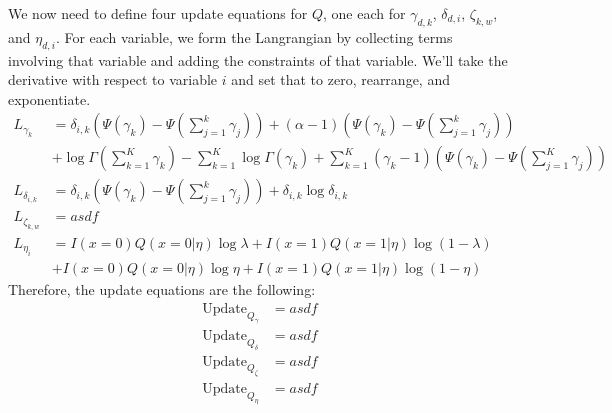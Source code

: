 \documentclass[12pt]{article}
\begin{document}
We now need to define four update equations for $Q$, one each for $\gamma_{d,k}$, $\delta_{d,i}$, $\zeta_{k,w}$, and $\eta_{d,i}$.  For each variable, we form the Langrangian by collecting terms involving that variable and adding the constraints of that variable.  We'll take the derivative with respect to variable $i$ and set that to zero, rearrange, and exponentiate.
\begin{align*}
L_{\gamma_{k}} &= \delta_{i,k}(\Psi(\gamma_k) - \Psi(\sum_{j=1}^k \gamma_j) ) + (\alpha - 1)(\Psi(\gamma_k) - \Psi(\sum_{j=1}^k \gamma_j) ) \\ 
&+ \log \Gamma (\sum\limits_{k=1}^K \gamma_k) - \sum\limits_{k=1}^K \log \Gamma(\gamma_k) + \sum\limits_{k=1}^K (\gamma_k - 1)(\Psi(\gamma_k) - \Psi(\sum_{j=1}^K \gamma_j) ) \\ 
L_{\delta_{i,k}} &= \delta_{i,k}(\Psi(\gamma_k) - \Psi(\sum_{j=1}^k \gamma_j) ) + \delta_{i,k} \log \delta_{i,k} \\
L_{\zeta_{k,w}} &= asdf \\
L_{\eta_{i}} &= I(x=0) Q(x=0|\eta) \log \lambda + I(x=1) Q(x=1|\eta) \log (1-\lambda) \\
&+ I(x=0) Q(x=0|\eta) \log \eta + I(x=1) Q(x=1|\eta) \log (1-\eta)
\end{align*}
Therefore, the update equations are the following:
\begin{align*}
\mathrm{Update}_{Q_\gamma} &= asdf \\ 
\mathrm{Update}_{Q_\delta} &= asdf \\
\mathrm{Update}_{Q_\zeta} &= asdf \\
\mathrm{Update}_{Q_\eta} &= asdf 
\end{align*}



\end{document}
